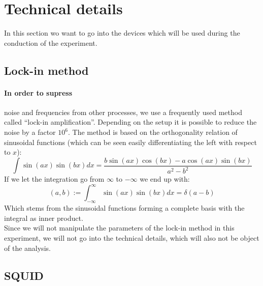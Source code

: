 \section{Technical details}
\label{sec:technics}
In this section wo want to go into the devices which will be used during the
conduction of the experiment.
\subsection{Lock-in method}
\paragraph{In order to supress}
noise and frequencies from other processes, we use
a frequently used method called ``lock-in amplification''. Depending on the
setup it is possible to reduce the noise by a factor $10^6$. The method
is based on the orthogonality relation of sinusoidal functions (which
can be seen easily differentiating the left with respect to $x$):
\begin{equation}
    \int \sin(a x) \sin(b x) dx =\frac{ b \sin(a x) \cos(b x)-a \cos(a x)
            \sin(b x)}{a^2-b^2}
\end{equation}
If we let the integration go from $\infty$ to $-\infty$ we end up with:
\begin{equation}
    (a,b) := \int_{-\infty}^{\infty} \sin(a x) \sin(b x) dx = \delta(a - b)
\end{equation}
Which stems from the sinusoidal functions forming a complete basis with
the integral as inner product.\\
Since we will not manipulate the parameters of the lock-in method in this
experiment, we will not go into the technical details, which
will also not be object of the analysis.
\subsection{SQUID}
